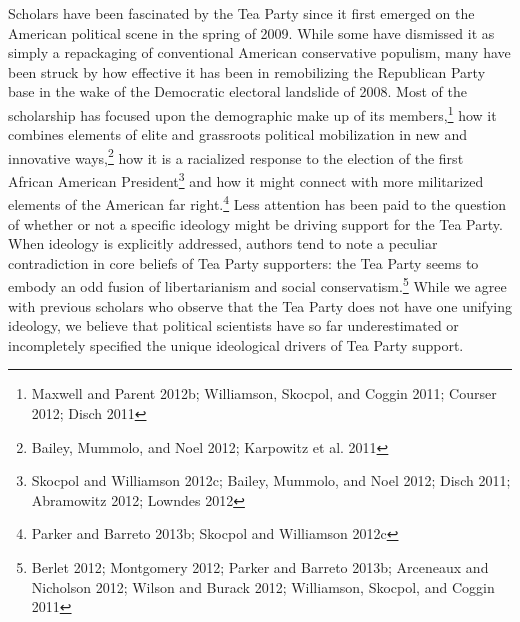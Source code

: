 \documentclass[12pt,]{article}
\begin{document}
Scholars have been fascinated by the Tea Party since it first emerged on
the American political scene in the spring of 2009. While some have
dismissed it as simply a repackaging of conventional American
conservative populism, many have been struck by how effective it has
been in remobilizing the Republican Party base in the wake of the
Democratic electoral landslide of 2008. Most of the scholarship has
focused upon the demographic make up of its members,\footnote{Maxwell
  and Parent 2012b; Williamson, Skocpol, and Coggin 2011; Courser 2012;
  Disch 2011} how it combines elements of elite and grassroots political
mobilization in new and innovative ways,\footnote{Bailey, Mummolo, and
  Noel 2012; Karpowitz et al. 2011} how it is a racialized response to
the election of the first African American President\footnote{Skocpol
  and Williamson 2012c; Bailey, Mummolo, and Noel 2012; Disch 2011;
  Abramowitz 2012; Lowndes 2012} and how it might connect with more
militarized elements of the American far right.\footnote{Parker and
  Barreto 2013b; Skocpol and Williamson 2012c} Less attention has been
paid to the question of whether or not a specific ideology might be
driving support for the Tea Party. When ideology is explicitly
addressed, authors tend to note a peculiar contradiction in core beliefs
of Tea Party supporters: the Tea Party seems to embody an odd fusion of
libertarianism and social conservatism.\footnote{Berlet 2012; Montgomery
  2012; Parker and Barreto 2013b; Arceneaux and Nicholson 2012; Wilson
  and Burack 2012; Williamson, Skocpol, and Coggin 2011} While we agree
with previous scholars who observe that the Tea Party does not have one
unifying ideology, we believe that political scientists have so far
underestimated or incompletely specified the unique ideological drivers
of Tea Party support.
\end{document}

